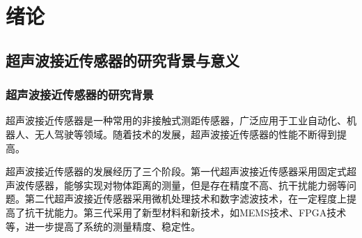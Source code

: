 	\newpage
	\section{绪论}
    \subsection{超声波接近传感器的研究背景与意义}
    \subsubsection{超声波接近传感器的研究背景}
    超声波接近传感器是一种常用的非接触式测距传感器，广泛应用于工业自动化、机器人、无人驾驶等领域。随着技术的发展，超声波接近传感器的性能不断得到提高。\par    
    超声波接近传感器的发展经历了三个阶段。第一代超声波接近传感器采用固定式超声波传感器，能够实现对物体距离的测量，但是存在精度不高、抗干扰能力弱等问题。第二代超声波接近传感器采用微机处理技术和数字滤波技术，在一定程度上提高了抗干扰能力。第三代采用了新型材料和新技术，如MEMS技术、FPGA技术等，进一步提高了系统的测量精度、稳定性。
%	
%	
%	
%		
